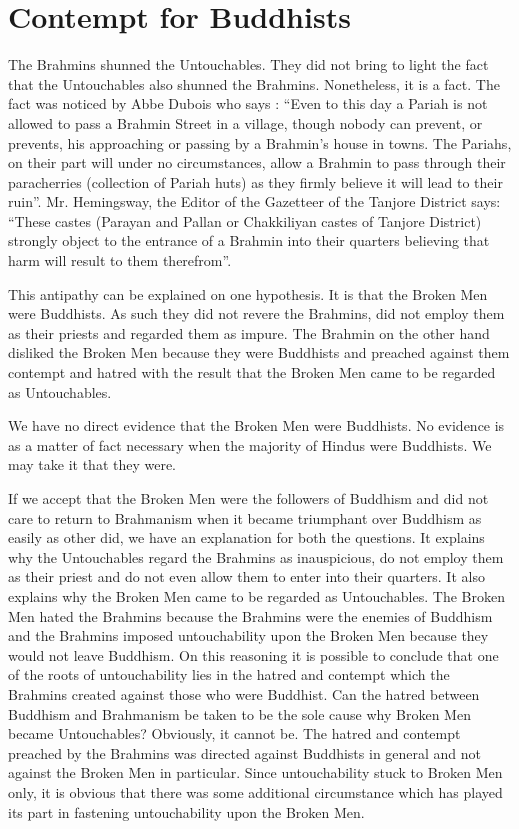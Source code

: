 \documentclass{article}
\begin{document}
\section{Contempt for Buddhists}
\begin{shadequote}
The Brahmins shunned the Untouchables. They did not bring to light the fact that the Untouchables also shunned the Brahmins. Nonetheless, it is a fact. 
The fact was noticed by Abbe Dubois who says \cite{dubois1}:
``Even to this day a Pariah is not allowed to pass a Brahmin Street in a village, though nobody can prevent, or prevents, his approaching or passing by a Brahmin's house in towns. The Pariahs, on their part will under no circumstances, allow a Brahmin to pass through their paracherries (collection of Pariah huts) as they firmly believe it will lead to their ruin''.
Mr. Hemingsway, the Editor of the Gazetteer of the Tanjore District says:
``These castes (Parayan and Pallan or Chakkiliyan castes of Tanjore District) strongly object to the entrance of a Brahmin into their quarters believing that harm will result to them therefrom''.

This antipathy can be explained on one hypothesis. It is that the Broken Men were Buddhists. As such they did not revere the Brahmins, did not employ them as their priests and regarded them as impure. The Brahmin on the other hand disliked the Broken Men because they were Buddhists and preached against them contempt and hatred with the result that the Broken Men came to be regarded as Untouchables.

We have no direct evidence that the Broken Men were Buddhists. No evidence is as a matter of fact necessary when the majority of Hindus were Buddhists. We may take it that they were.

If we accept that the Broken Men were the followers of Buddhism and did not care to return to Brahmanism when it became triumphant over Buddhism as easily as other did, we have an explanation for both the questions. It explains why the Untouchables regard the Brahmins as inauspicious, do not employ them as their priest and do not even allow them to enter into their quarters. It also explains why the Broken Men came to be regarded as Untouchables. The Broken Men hated the Brahmins because the Brahmins were the enemies of Buddhism and the Brahmins imposed untouchability upon the Broken Men because they would not leave Buddhism. On this reasoning it is possible to conclude that one of the roots of untouchability lies in the hatred and contempt which the Brahmins created against those who were Buddhist.
Can the hatred between Buddhism and Brahmanism be taken to be the sole cause why Broken Men became Untouchables? Obviously, it cannot be. The hatred and contempt preached by the Brahmins was directed against Buddhists in general and not against the Broken Men in particular. Since untouchability stuck to Broken Men only, it is obvious that there was some additional circumstance which has played its part in fastening untouchability upon the Broken Men. 
\end{shadequote}
\end{document}
